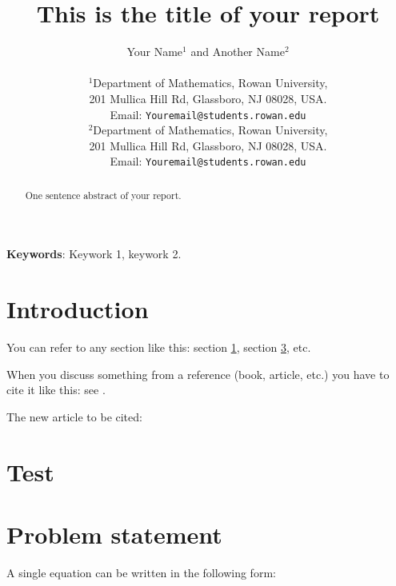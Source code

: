 \documentclass[12pt]{article}
\numberwithin{equation}{section}
\begin{document}

\title{This is the title of your report}
\author{Your Name$^{1}$ and Another Name$^2$ \\
\\
$^1$Department of Mathematics, Rowan University, \\
201 Mullica Hill Rd, Glassboro, NJ 08028, USA. \\
Email: \texttt{Youremail@students.rowan.edu} \\
$^2$Department of Mathematics, Rowan University, \\
201 Mullica Hill Rd, Glassboro, NJ 08028, USA. \\
Email: \texttt{Youremail@students.rowan.edu} \\
}

\date{}
\maketitle

\begin{abstract}
One sentence abstract of your report. 
\end{abstract}

\textbf{Keywords}: Keywork 1, keywork 2. 



\section{Introduction} \label{sec:int} %

You can refer to any section like this: section  \ref{sec:int}, section \ref{sec:2}, etc. 


When you discuss something from a reference (book, article, etc.) you have to cite it like this: see \cite{BKK}. 


The new article to be cited: \cite{Bento:JAND2017}

\section{Test}\label{sec:test}

\section{Problem statement}\label{sec:2}

A single equation can be written in the following form: 
\end{document}
